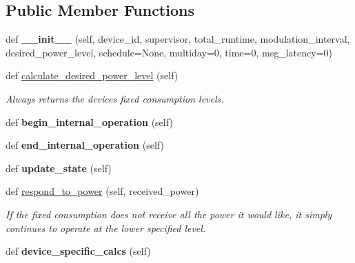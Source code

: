 \subsection*{Public Member Functions}
\begin{DoxyCompactItemize}
\item 
\mbox{\label{class_build_1_1_objects_1_1fixed__consumption_1_1_fixed_consumption_ab05aa0b7096a5d0933e364496d851bbf}} 
def {\bfseries \+\_\+\+\_\+init\+\_\+\+\_\+} (self, device\+\_\+id, supervisor, total\+\_\+runtime, modulation\+\_\+interval, desired\+\_\+power\+\_\+level, schedule=None, multiday=0, time=0, msg\+\_\+latency=0)
\item 
\mbox{\label{class_build_1_1_objects_1_1fixed__consumption_1_1_fixed_consumption_a16b7133c71492ac7e61a58d1c20676c7}} 
def \hyperlink{class_build_1_1_objects_1_1fixed__consumption_1_1_fixed_consumption_a16b7133c71492ac7e61a58d1c20676c7}{calculate\+\_\+desired\+\_\+power\+\_\+level} (self)
\begin{DoxyCompactList}\small\item\em Always returns the device\textquotesingle{}s fixed consumption levels. \end{DoxyCompactList}\item 
\mbox{\label{class_build_1_1_objects_1_1fixed__consumption_1_1_fixed_consumption_a4738a9f17cadf91fbc76944243fbe012}} 
def {\bfseries begin\+\_\+internal\+\_\+operation} (self)
\item 
\mbox{\label{class_build_1_1_objects_1_1fixed__consumption_1_1_fixed_consumption_a16e77571984fb450ff9f2272c8b02cab}} 
def {\bfseries end\+\_\+internal\+\_\+operation} (self)
\item 
\mbox{\label{class_build_1_1_objects_1_1fixed__consumption_1_1_fixed_consumption_a61b415b965444d6f699e3e41a48df3c4}} 
def {\bfseries update\+\_\+state} (self)
\item 
def \hyperlink{class_build_1_1_objects_1_1fixed__consumption_1_1_fixed_consumption_adc5b45c93ea370e11aecc8f87e2eebbc}{respond\+\_\+to\+\_\+power} (self, received\+\_\+power)
\begin{DoxyCompactList}\small\item\em If the fixed consumption does not receive all the power it would like, it simply continues to operate at the lower specified level. \end{DoxyCompactList}\item 
\mbox{\label{class_build_1_1_objects_1_1fixed__consumption_1_1_fixed_consumption_aaba851d898ec11cbc9a960cb4461558d}} 
def {\bfseries device\+\_\+specific\+\_\+calcs} (self)
\end{DoxyCompactItemize}
